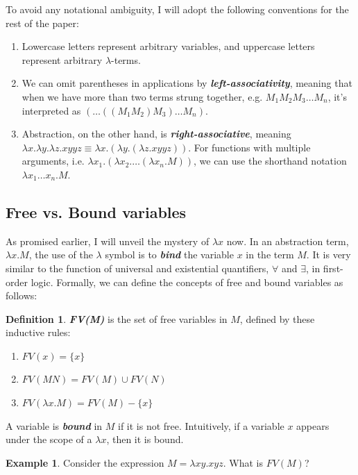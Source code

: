 \documentclass[a4paper,11pt]{article}
\theoremstyle{definition}
\newtheorem{definition}{Definition}[section]
\theoremstyle{example}
\newtheorem*{example}{Example}
\theoremstyle{lemma}
\newcommand{\lamterm}[2]{\lambda #1. #2}
\begin{document}
To avoid any notational ambiguity, I will adopt the following conventions for the rest of the paper:
\begin{enumerate}[topsep=1pt,itemsep=-1ex,partopsep=1ex,parsep=1ex]
    \item Lowercase letters represent arbitrary variables, and uppercase letters represent arbitrary $\lambda$-terms.
    \item We can omit parentheses in applications by \textit{\textbf{left-associativity}}, meaning that when we have more than two terms strung together, e.g. $M_1M_2M_3\dots M_n$, it's interpreted as $(\dots((M_1M_2)M_3)\dots M_n)$.
    \item Abstraction, on the other hand, is \textit{\textbf{right-associative}}, meaning $\lamterm{x}{\lamterm{y}{\lamterm{z}{xyyz}}} \equiv \lamterm{x}{(\lamterm{y}{(\lamterm{z}{xyyz})})}$. For functions with multiple arguments, i.e. $\lamterm{x_1}{(\lamterm{x_2}{\dots(\lamterm{x_n}{M})})}$, we can use the shorthand notation $\lamterm{x_1\dots x_n}{M}$.
\end{enumerate}

\subsection{Free vs. Bound variables}
As promised earlier, I will unveil the mystery of $\lambda x$ now. In an abstraction term, $\lamterm{x}{M}$, the use of the $\lambda$ symbol is to \textit{\textbf{bind}} the variable $x$ in the term $M$. It is very similar to the function of universal and existential quantifiers, $\forall$ and $\exists$, in first-order logic. Formally, we can define the concepts of free and bound variables as follows:
\theoremstyle{definition}
\begin{definition}{}
\textit{\textbf{FV(M)}} is the set of free variables in $M$, defined by these inductive rules:
\begin{enumerate}[topsep=1pt,itemsep=-1ex,partopsep=1ex,parsep=1ex]
    \item $FV(x) = \{x\}$
    \item $FV(MN) = FV(M) \cup FV(N)$
    \item $FV(\lamterm{x}{M}) = FV(M) - \{x\}$
\end{enumerate}
A variable is \textit{\textbf{bound}} in $M$ if it is not free. Intuitively, if a variable $x$ appears under the scope of a $\lambda x$, then it is bound.
\end{definition}

\begin{example}{}
Consider the expression $M = \lamterm{xy}{xyz}$. What is $FV(M)$?
\end{example}
\end{document}
